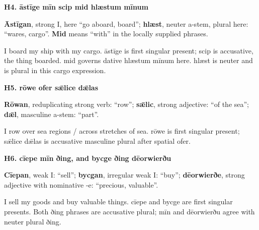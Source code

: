 \par\begin{minipage}{\linewidth}\raggedright
\textbf{H4. āstīge mīn scip mid hlæstum mīnum}

\textbf{Āstīgan}, strong I, here “go aboard, board”; \textbf{hlæst}, neuter a-stem, plural here: “wares, cargo”. \textbf{Mid} means “with” in the locally supplied phrases.

I board my ship with my cargo. āstīge is first singular present; scip is accusative, the thing boarded. mid governs dative hlæstum mīnum here. hlæst is neuter and is plural in this cargo expression.

\end{minipage}\par\addvspace{4pt}

\par\begin{minipage}{\linewidth}\raggedright
\textbf{H5. rōwe ofer sǣlice dǣlas}

\textbf{Rōwan}, reduplicating strong verb: “row”; \textbf{sǣlic}, strong adjective: “of the sea”; \textbf{dǣl}, masculine a-stem: “part”.

I row over sea regions /\allowbreak{} across stretches of sea. rōwe is first singular present; sǣlice dǣlas is accusative masculine plural after spatial ofer.

\end{minipage}\par\addvspace{4pt}

\par\begin{minipage}{\linewidth}\raggedright
\textbf{H6. cīepe mīn ðing, and bycge ðing dēorwierðu}

\textbf{Cīepan}, weak I: “sell”; \textbf{bycgan}, irregular weak I: “buy”; \textbf{dēorwierðe}, strong adjective with nominative -e: “precious, valuable”.

I sell my goods and buy valuable things. cīepe and bycge are first singular presents. Both ðing phrases are accusative plural; mīn and dēorwierðu agree with neuter plural ðing.

\end{minipage}\par\addvspace{4pt}

